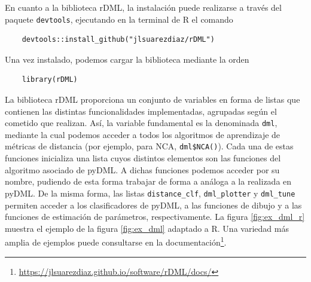 En cuanto a la biblioteca rDML, la instalación puede realizarse a través del paquete \texttt{devtools}, ejecutando en la terminal de R el comando
\begin{verbatim}
    devtools::install_github("jlsuarezdiaz/rDML")
\end{verbatim}
Una vez instalado, podemos cargar la biblioteca mediante la orden
\begin{verbatim}
    library(rDML)
\end{verbatim}
La biblioteca rDML proporciona un conjunto de variables en forma de listas que contienen las distintas funcionalidades implementadas, agrupadas según el cometido que realizan. Así, la variable fundamental es la denominada \texttt{dml}, mediante la cual podemos acceder a todos los algoritmos de aprendizaje de métricas de distancia (por ejemplo, para NCA, \texttt{dml\$NCA()}). Cada una de estas funciones inicializa una lista cuyos distintos elementos son las funciones del algoritmo asociado de pyDML. A dichas funciones podemos acceder por su nombre, pudiendo de esta forma trabajar de forma a análoga a la realizada en pyDML. De la misma forma, las listas \texttt{distance\_clf}, \texttt{dml\_plotter} y \texttt{dml\_tune} permiten acceder a los clasificadores de pyDML, a las funciones de dibujo y a las funciones de estimación de parámetros, respectivamente. La figura \ref{fig:ex_dml_r} muestra el ejemplo de la figura \ref{fig:ex_dml} adaptado a R. Una variedad más amplia de ejemplos puede consultarse en la documentación\footnote{\url{https://jlsuarezdiaz.github.io/software/rDML/docs/}}.
